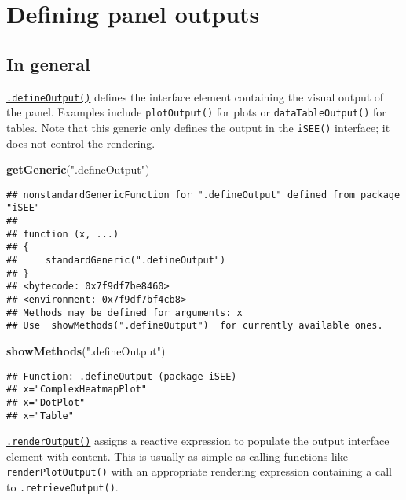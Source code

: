 \documentclass[
]{book}
\newenvironment{Shaded}{\begin{snugshade}}{\end{snugshade}}
\newcommand{\KeywordTok}[1]{\textcolor[rgb]{0.13,0.29,0.53}{\textbf{#1}}}
\newcommand{\NormalTok}[1]{#1}
\newcommand{\StringTok}[1]{\textcolor[rgb]{0.31,0.60,0.02}{#1}}
\begin{document}
\hypertarget{defining-panel-outputs}{%
\section{Defining panel outputs}\label{defining-panel-outputs}}

\hypertarget{in-general-1}{%
\subsection{In general}\label{in-general-1}}

\href{https://isee.github.io/iSEE/reference/output-generics.html}{\texttt{.defineOutput()}} defines the interface element containing the visual output of the panel.
Examples include \texttt{plotOutput()} for plots or \texttt{dataTableOutput()} for tables.
Note that this generic only defines the output in the \texttt{iSEE()} interface; it does not control the rendering.

\begin{Shaded}
\begin{Highlighting}[]
\KeywordTok{getGeneric}\NormalTok{(}\StringTok{".defineOutput"}\NormalTok{)}
\end{Highlighting}
\end{Shaded}

\begin{verbatim}
## nonstandardGenericFunction for ".defineOutput" defined from package "iSEE"
## 
## function (x, ...) 
## {
##     standardGeneric(".defineOutput")
## }
## <bytecode: 0x7f9df7be8460>
## <environment: 0x7f9df7bf4cb8>
## Methods may be defined for arguments: x
## Use  showMethods(".defineOutput")  for currently available ones.
\end{verbatim}

\begin{Shaded}
\begin{Highlighting}[]
\KeywordTok{showMethods}\NormalTok{(}\StringTok{".defineOutput"}\NormalTok{)}
\end{Highlighting}
\end{Shaded}

\begin{verbatim}
## Function: .defineOutput (package iSEE)
## x="ComplexHeatmapPlot"
## x="DotPlot"
## x="Table"
\end{verbatim}

\href{https://isee.github.io/iSEE/reference/output-generics.html}{\texttt{.renderOutput()}} assigns a reactive expression to populate the output interface element with content.
This is usually as simple as calling functions like \texttt{renderPlotOutput()} with an appropriate rendering expression containing a call to \texttt{.retrieveOutput()}.
\end{document}
